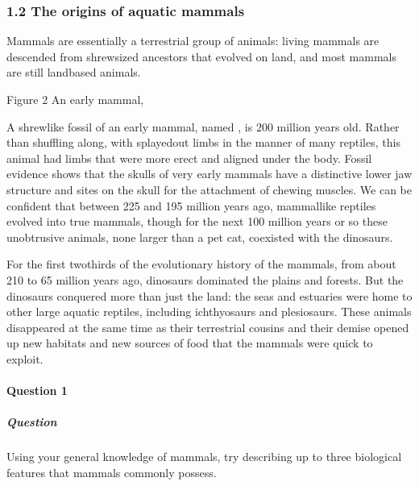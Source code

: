 \documentclass[letterpaper,10pt,english]{sphinxmanual}
\let\sphinxpxdimen\pdfpxdimen\else\newdimen\sphinxpxdimen
\begin{document}
\subsubsection{1.2 The origins of aquatic mammals}
\label{\detokenize{content/session_00/Part_00_01:1.2-The-origins-of-aquatic-mammals}}
Mammals are essentially a terrestrial group of animals: living mammals are descended from shrew\sphinxhyphen{}sized ancestors that evolved on land, and most mammals are still land\sphinxhyphen{}based animals.

\sphinxincludegraphics[width=512\sphinxpxdimen,height=341\sphinxpxdimen]{{s182_11_figure_2_megazostrodon}.jpg}

Figure 2 An early mammal, 

A shrew\sphinxhyphen{}like fossil of an early mammal, named , is 200 million years old. Rather than shuffling along, with splayed\sphinxhyphen{}out limbs in the manner of many reptiles, this animal had limbs that were more erect and aligned under the body. Fossil evidence shows that the skulls of very early mammals have a distinctive lower jaw structure and sites on the skull for the attachment of chewing muscles. We can be confident that between 225 and 195 million years ago, mammal\sphinxhyphen{}like reptiles evolved
into true mammals, though for the next 100 million years or so these unobtrusive animals, none larger than a pet cat, co\sphinxhyphen{}existed with the dinosaurs.

For the first two\sphinxhyphen{}thirds of the evolutionary history of the mammals, from about 210 to 65 million years ago, dinosaurs dominated the plains and forests. But the dinosaurs conquered more than just the land: the seas and estuaries were home to other large aquatic reptiles, including ichthyosaurs and plesiosaurs. These animals disappeared at the same time as their terrestrial cousins \textendash{} and their demise opened up new habitats and new sources of food that the mammals were quick to exploit.


\paragraph{Question 1}
\label{\detokenize{content/session_00/Part_00_01:Question-1}}


\subparagraph{Question}
\label{\detokenize{content/session_00/Part_00_01:id2}}
Using your general knowledge of mammals, try describing up to three biological features that mammals commonly possess.
\end{document}
